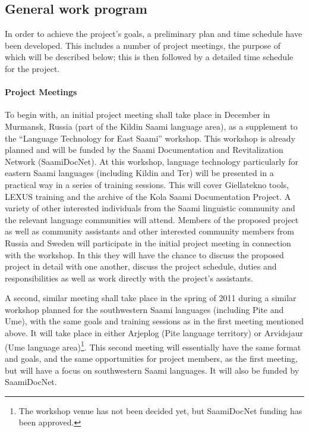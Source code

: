 \documentclass[a4paper,12pt]{article}
\begin{document}
{{{{\subsection{General work program}

In order to achieve the project's goals, a preliminary plan and time schedule have been developed. This includes a number of project meetings, the purpose of which will be described below; this is then followed by a detailed time schedule for the project.

\paragraph{Project Meetings}\label{meetings}
To begin with, an initial project meeting shall take place in December in Murmansk, Russia (part of the Kildin Saami language area), as a supplement to the “Language Technology for East Saami” workshop. This workshop is already planned and will be funded by the Saami Documentation and Revitalization Network (SaamiDocNet). At this workshop, language technology particularly for eastern Saami languages (including Kildin and Ter) will be presented in a practical way in a series of training sessions. This will cover Giellatekno tools, LEXUS training and the archive of the Kola Saami Documentation Project. A variety of other interested individuals from the Saami linguistic community and the relevant language communities will attend. Members of the proposed project as well as community assistants and other interested community members from Russia and Sweden will participate in the initial project meeting in connection with the workshop. In this they will have the chance to discuss the proposed project in detail with one another, discuss the project schedule, duties and responsibilities as well as work directly with the project's assistants.

A second, similar meeting shall take place in the spring of 2011 during a similar workshop planned for the southwestern Saami languages (including Pite and Ume), with the same goals and training sessions as in the first meeting mentioned above. It will take place in either Arjeplog (Pite language territory) or Arvidsjaur (Ume language area)\footnote{The workshop venue has not been decided yet, but SaamiDocNet funding has been approved.}. This second meeting will essentially have the same format and goals, and the same opportunities for project members, as the first meeting, but will have a focus on southwestern Saami languages. It will also be funded by SaamiDocNet.

}}}}
\end{document}
